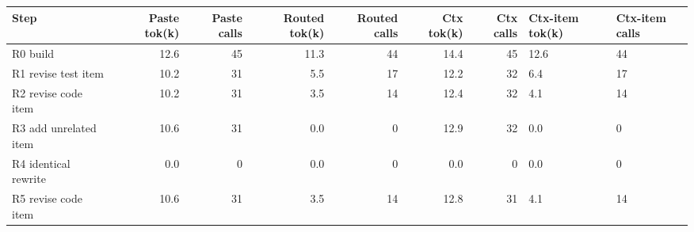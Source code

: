 \begin{tabular}{@{}lrrrrrr@{}}
\toprule
Step & Paste tok(k) & Paste calls & Routed tok(k) & Routed calls & Ctx tok(k) & Ctx calls & Ctx-item tok(k) & Ctx-item calls \\
\midrule
R0 build & 12.6 & 45 & 11.3 & 44 & 14.4 & 45 & 12.6 & 44 \\
R1 revise test item & 10.2 & 31 & 5.5 & 17 & 12.2 & 32 & 6.4 & 17 \\
R2 revise code item & 10.2 & 31 & 3.5 & 14 & 12.4 & 32 & 4.1 & 14 \\
R3 add unrelated item & 10.6 & 31 & 0.0 & 0 & 12.9 & 32 & 0.0 & 0 \\
R4 identical rewrite & 0.0 & 0 & 0.0 & 0 & 0.0 & 0 & 0.0 & 0 \\
R5 revise code item & 10.6 & 31 & 3.5 & 14 & 12.8 & 31 & 4.1 & 14 \\
\bottomrule
\end{tabular}
